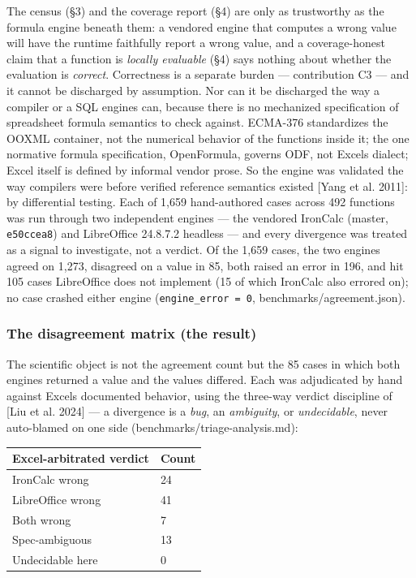 \documentclass[
]{article}
\newcounter{none} %
\begin{document}
The census (§3) and the coverage report (§4) are only as trustworthy as
the formula engine beneath them: a vendored engine that computes a wrong
value will have the runtime faithfully report a wrong value, and a
coverage-honest claim that a function is \emph{locally evaluable} (§4)
says nothing about whether the evaluation is \emph{correct}. Correctness
is a separate burden --- contribution C3 --- and it cannot be discharged
by assumption. Nor can it be discharged the way a compiler or a SQL
engine\textquotesingle s can, because there is no mechanized
specification of spreadsheet formula semantics to check against.
ECMA-376 standardizes the OOXML container, not the numerical behavior of
the functions inside it; the one normative formula specification,
OpenFormula, governs ODF, not Excel\textquotesingle s dialect; Excel
itself is defined by informal vendor prose. So the engine was validated
the way compilers were before verified reference semantics existed
{[}Yang et al. 2011{]}: by differential testing. Each of 1,659
hand-authored cases across 492 functions was run through two independent
engines --- the vendored IronCalc (master, \texttt{e50ccea8}) and
LibreOffice 24.8.7.2 headless --- and every divergence was treated as a
signal to investigate, not a verdict. Of the 1,659 cases, the two
engines agreed on 1,273, disagreed on a value in 85, both raised an
error in 196, and hit 105 cases LibreOffice does not implement (15 of
which IronCalc also errored on); no case crashed either engine
(\texttt{engine\_error\ =\ 0}, benchmarks/agreement.json).

\subsubsection{The disagreement matrix (the
result)}\label{the-disagreement-matrix-the-result}

The scientific object is not the agreement count but the 85 cases in
which both engines returned a value and the values differed. Each was
adjudicated by hand against Excel\textquotesingle s documented behavior,
using the three-way verdict discipline of {[}Liu et al. 2024{]} --- a
divergence is a \emph{bug}, an \emph{ambiguity}, or \emph{undecidable},
never auto-blamed on one side (benchmarks/triage-analysis.md):

{\def\LTcaptype{none} %
\begin{longtable}[]{@{}ll@{}}
\toprule\noalign{}
Excel-arbitrated verdict & Count \\
\midrule\noalign{}
\endhead
\bottomrule\noalign{}
\endlastfoot
IronCalc wrong & 24 \\
LibreOffice wrong & 41 \\
Both wrong & 7 \\
Spec-ambiguous & 13 \\
Undecidable here & 0 \\
\end{longtable}
}
\end{document}
